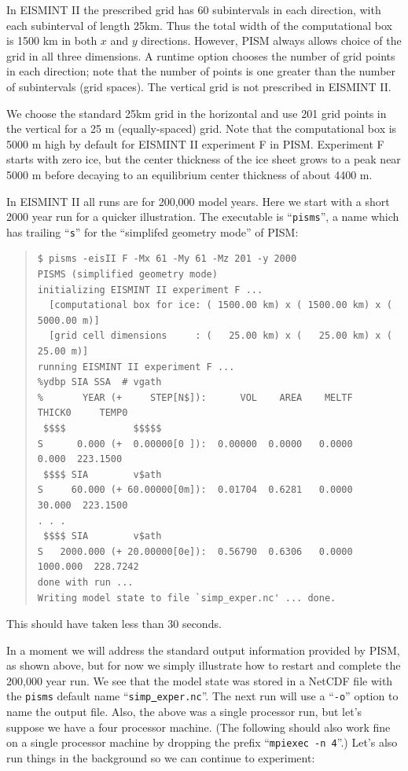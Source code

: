 \documentclass[11pt,final]{amsart}
\renewcommand{\t}[1]{\texttt{#1}}
\begin{document}
In EISMINT II the prescribed grid has 60 subintervals in each direction, with each subinterval of length 25km.  Thus the total width of the computational box is 1500 km in both $x$ and $y$ directions.  However, PISM always allows choice of the grid in all three dimensions.  A runtime option chooses the number of grid points in each direction; note that the number of points is one greater than the number of subintervals (grid spaces).  The vertical grid is not prescribed in EISMINT II.

We choose the standard 25km grid in the horizontal and use 201 grid points in the vertical for a 25 m (equally-spaced) grid.  Note that the computational box is 5000 m high by default for EISMINT II experiment F in PISM.  Experiment F starts with zero ice, but the center thickness of the ice sheet grows to a peak near 5000 m before decaying to an equilibrium center thickness of about 4400 m.

In EISMINT II all runs are for 200,000 model years.  Here we start with a short 2000 year run for a quicker illustration.  The executable is ``\t{pisms}'', a name which has trailing ``\t{s}'' for the ``simplifed geometry mode'' of PISM:

\small\begin{quote}\begin{verbatim}
$ pisms -eisII F -Mx 61 -My 61 -Mz 201 -y 2000
PISMS (simplified geometry mode)
initializing EISMINT II experiment F ... 
  [computational box for ice: ( 1500.00 km) x ( 1500.00 km) x ( 5000.00 m)]
  [grid cell dimensions     : (   25.00 km) x (   25.00 km) x (   25.00 m)]
running EISMINT II experiment F ...
%ydbp SIA SSA  # vgath
%       YEAR (+     STEP[N$]):      VOL    AREA    MELTF     THICK0     TEMP0
 $$$$            $$$$$
S      0.000 (+  0.00000[0 ]):  0.00000  0.0000   0.0000      0.000  223.1500
 $$$$ SIA        v$ath
S     60.000 (+ 60.00000[0m]):  0.01704  0.6281   0.0000     30.000  223.1500
. . .
 $$$$ SIA        v$ath
S   2000.000 (+ 20.00000[0e]):  0.56790  0.6306   0.0000   1000.000  228.7242
done with run ... 
Writing model state to file `simp_exper.nc' ... done.
\end{verbatim}
\end{quote}\normalsize
\noindent This should have taken less than 30 seconds.

In a moment we will address the standard output information provided by PISM, as shown above, but for now we simply illustrate how to restart and complete the 200,000 year run.  We see that the model state was stored in a NetCDF file with the \verb|pisms| default name ``\texttt{simp\underline{ }exper.nc}''.  The next run will use a ``\verb|-o|'' option to name the output file.  Also, the above was a single processor run, but let's suppose we have a four processor machine.  (The following should also work fine on a single processor machine  by dropping the prefix ``\verb|mpiexec -n 4|''.)  Let's also run things in the background so we can continue to experiment:
\end{document}
